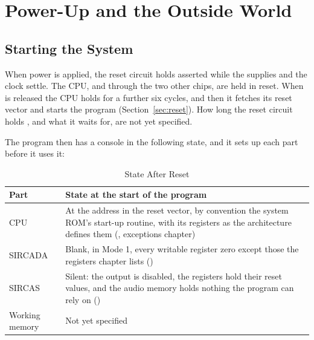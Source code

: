 \chapter{Power-Up and the Outside World}
\label{ch:power-up}

\section{Starting the System}
\label{sec:system-start}

When power is applied, the reset circuit holds  asserted while the supplies and the clock settle. The
CPU, and through  the two other chips, are held in reset. When  is released the CPU
holds  for a further six cycles, and then it fetches its reset vector and starts the program
(Section~\ref{sec:reset}). How long the reset circuit holds , and what it waits for, are not yet
specified.

The program then has a console in the following state, and it sets up each part before it uses it:

\begin{table}[H]
	\centering
	\begin{tabular}{lp{8.4cm}}
		\toprule
		\textbf{Part}  & \textbf{State at the start of the program}                                                                                                                                   \\
		\midrule
		CPU            & At the address in the reset vector, by convention the system ROM's start-up routine, with its registers as the architecture defines them (\archmanual{}, exceptions chapter) \\
		SIRCADA        & Blank, in Mode 1, every writable register zero except those the registers chapter lists (\videomanual{})                                                                     \\
		SIRCAS         & Silent: the output is disabled, the registers hold their reset values, and the audio memory holds nothing the program can rely on (\audiomanual{})                           \\
		Working memory & Not yet specified                                                                                                                                                            \\
		\bottomrule
	\end{tabular}
	\caption{State After Reset}
	\label{tab:reset-state}
\end{table}

